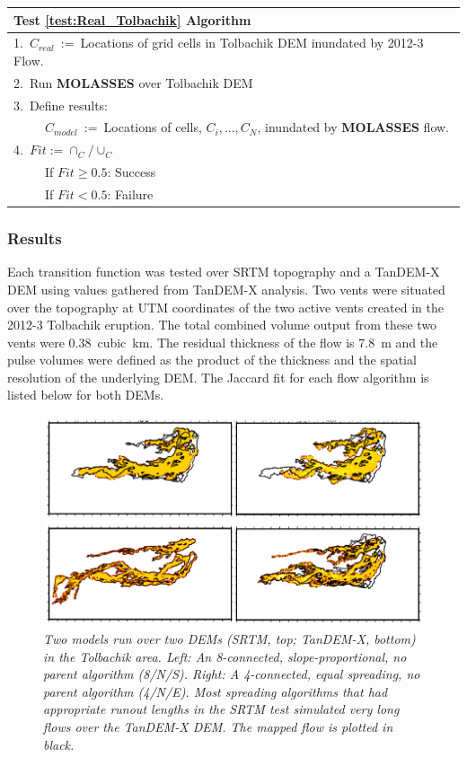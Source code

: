 \documentclass[12pt,letter]{article}
\newcommand{\tabitem}{~~\llap{\textbullet}~~}
\newcommand{\tabitem}{~~\llap{\textbullet}~~}
\begin{document}
			\begin{center}
				\begin{tabular}{l}
					\toprule
					\textbf{Test \ref{test:Real_Tolbachik} Algorithm}\\
					\midrule
					1.~$C_{real}$~:=~Locations of grid cells in Tolbachik DEM inundated by 2012-3 Flow.\\
					2.~Run \textbf{MOLASSES} over Tolbachik DEM\\
					3.~Define results:\\
						~\tabitem $C_{model}$~:=~Locations of cells, $C_i,...,C_N$, inundated by \textbf{MOLASSES} flow.\\
					4.~$Fit:=\cap_C/\cup_C$\\
						~\tabitem If $Fit\ge0.5$: Success\\
						~\tabitem If $Fit<0.5$: Failure\\
					\bottomrule
				\end{tabular}
			\end{center}
			
	\subsubsection{Results}
	
	Each transition function was tested over SRTM topography and a TanDEM-X DEM using values gathered from TanDEM-X analysis. Two vents were situated over the topography at UTM coordinates of the two active vents created in the 2012-3 Tolbachik eruption. The total combined volume output from these two vents were 0.38~cubic~km. The residual thickness of the flow is 7.8~m and the pulse volumes were defined as the product of the thickness and the spatial resolution of the underlying DEM. The Jaccard fit for each flow algorithm is listed below for both DEMs.
		\begin{figure}[!h]
			\centering
			\includegraphics[width=0.7\linewidth]{figures/tolbachik}
			\caption{\textit{Two models run over two DEMs (SRTM, top; TanDEM-X, bottom) in the Tolbachik area. Left: An 8-connected, slope-proportional, no parent algorithm (8/N/S). Right: A 4-connected, equal spreading, no parent algorithm (4/N/E). Most spreading algorithms that had appropriate runout lengths in the SRTM test simulated very long flows over the TanDEM-X DEM. The mapped flow is plotted in black.}}
			\label{fig:tolbachik}
		\end{figure}
		
\end{document}
